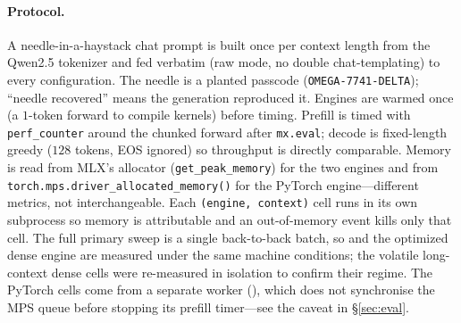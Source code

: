 \paragraph{Protocol.}
A needle-in-a-haystack chat prompt is built once per context length from the Qwen2.5 tokenizer and
fed verbatim (raw mode, no double chat-templating) to every configuration. The needle is a planted
passcode (\texttt{OMEGA-7741-DELTA}); ``needle recovered'' means the generation reproduced it.
Engines are warmed once (a $1$-token forward to compile kernels) before timing. Prefill is timed
with \texttt{perf\_counter} around the chunked forward after \texttt{mx.eval}; decode is
fixed-length greedy ($128$ tokens, EOS ignored) so throughput is directly comparable. Memory is
read from MLX's allocator (\texttt{get\_peak\_memory}) for the two \mlxe{} engines and from
\texttt{torch.mps.driver\_allocated\_memory()} for the PyTorch engine---different metrics, not
interchangeable. Each \texttt{(engine, context)} cell runs
in its own subprocess so memory is attributable and an out-of-memory event kills only that cell.
The full primary sweep is a single back-to-back batch, so \dkv{} and the optimized dense engine are
measured under the same machine conditions; the volatile long-context dense cells were re-measured
in isolation to confirm their regime. The PyTorch cells come from a separate worker
(), which does not synchronise the MPS queue before stopping its
prefill timer---see the caveat in \S\ref{sec:eval}.

